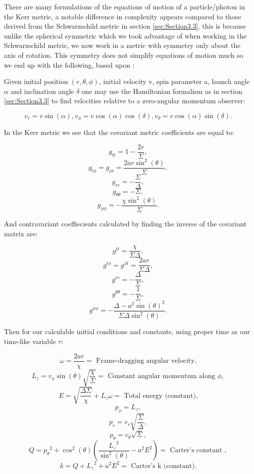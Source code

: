\documentclass[oneside,openright,frontopenright, singlespacing]{dmathesis}
\begin{document}
	There are many formulations of the equations of motion of a particle/photon in the Kerr metric, a notable difference in complexity appears compared to those derived from the Schwarzschild metric in section \ref{sec:Section3.3}, this is because unlike the spherical symmetric which we took advantage of when working in the Schwarzschild metric, we now work in a metric with symmetry only about the axis of rotation. This symmetry does not simplify equations of motion much so we end up with the following, based upon \cite{yukterezKerr}:

\vspace{1em}
	Given initial position $(r, \theta, \phi)$, initial velocity v, spin parameter a, launch angle $\alpha$ and inclination angle $\delta$ one may use the Hamiltonian formalism as in section \ref{sec:Section3.3} to find velocities relative to a zero-angular momentum observer:
	
	\[v_r = v\sin(\alpha), v_\phi = v\cos(\alpha)\cos(\delta), v_\theta = v\cos(\alpha)\sin(\delta).\]

\vspace{1em}
	In the Kerr metric we see that the covariant metric coefficients are equal to:

	\[g_{tt} = 1-\frac{2r}{\Sigma},\]
	\[g_{t\phi} = g_{{\phi}t} = \frac{2ar\sin^2(\theta)}{\Sigma},\]
	\[g_{rr} = -\frac{\Sigma}{\Delta},\]
	\[g_{\theta\theta} = -\Sigma,\]
	\[g_{\phi\phi} = -\frac{\chi\sin^2(\theta)}{\Sigma}.\]

	And contravariant coeffiecients calculated by finding the inverse of the covariant matrix are:

	\[g^{tt} = \frac{\chi}{\Sigma\Delta},\]
	\[g^{t\phi} = g^{{\phi}t} = \frac{2ar}{\Sigma\Delta},\]
	\[g^{rr} = -\frac{\Delta}{\Sigma},\]
	\[g^{\theta\theta} = -\frac{1}{\Sigma},\]
	\[g^{\phi\phi} = -\frac{\Delta-a^2\sin(\theta)^2}{\Sigma\Delta\sin^2(\theta)}.\]

\vspace{1em}
	Then for our calculable initial conditions and constants, using proper time as our time-like variable $\tau$:

	\[\omega = \frac{2ar}{\chi} = \mbox{ Frame-dragging angular velocity,}\]
	\[L_{z} = v_{\phi}\sin(\theta)\sqrt{\frac{\chi}{\Sigma}} = \mbox{ Constant angular momentum along } \phi,\]
	\[E = \sqrt{\frac{\Delta\Sigma}{\chi}}+L_{z}\omega = \mbox{ Total energy (constant),}\]
	\[p_{\phi} = L_{z},\]
	\[p_{r} = v_{r}\sqrt{\frac{\Sigma}{\Delta}},\]
	\[p_{\theta} = v_{\theta}\sqrt{\Sigma},\]
	\[Q = {p_{\theta}}^2+\cos^2(\theta)\left(\frac{{L_{z}}^2}{\sin^2(\theta)}-a^2E^2\right) = \mbox{ Carter's constant },\]
	\[k = Q+{L_{z}}^2+a^2E^2 = \mbox{ Carter's k (constant).}\]
\end{document}
